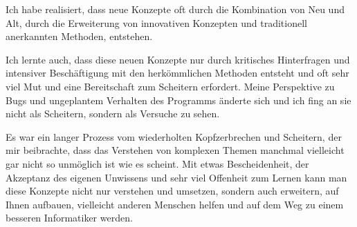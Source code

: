 \documentclass[
  manuscript=article,  %
  layout=publish,  %
  year=2023,
  volume=1,
]{extra/joas}
\begin{document}
Ich habe realisiert, dass neue Konzepte oft durch die Kombination von Neu und Alt, durch die Erweiterung von innovativen Konzepten und traditionell anerkannten Methoden, entstehen.

Ich lernte auch, dass diese neuen Konzepte nur durch kritisches Hinterfragen und intensiver Beschäftigung mit den herkömmlichen Methoden entsteht und oft sehr viel Mut und eine Bereitschaft zum Scheitern erfordert. Meine Perspektive zu Bugs und ungeplantem Verhalten des Programms änderte sich und ich fing an sie nicht als Scheitern, sondern als Versuche zu sehen.  

Es war ein langer Prozess vom wiederholten Kopfzerbrechen und Scheitern, der mir beibrachte, dass das Verstehen von komplexen Themen manchmal vielleicht gar nicht so unmöglich ist wie es scheint. Mit etwas Bescheidenheit, der Akzeptanz des eigenen Unwissens und sehr viel Offenheit zum Lernen kann man diese Konzepte nicht nur verstehen und umsetzen, sondern auch erweitern, auf Ihnen aufbauen, vielleicht anderen Menschen helfen und auf dem Weg zu einem besseren Informatiker werden.

\newpage

\printbibliography
\end{document}
